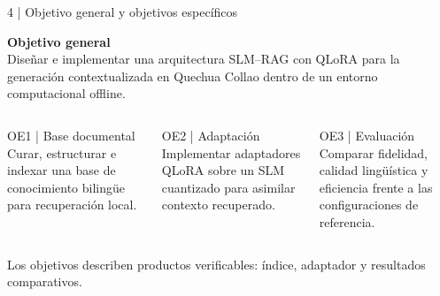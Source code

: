 \documentclass[aspectratio=169,10pt,spanish]{beamer}
\begin{document}
\begin{frame}{4 | Objetivo general y objetivos específicos}
\small
\begin{tcolorbox}[colback=bpNavy,colframe=bpNavy]
\color{white}\textbf{Objetivo general}\\
Diseñar e implementar una arquitectura SLM--RAG con QLoRA para la generación contextualizada en Quechua Collao dentro de un entorno computacional offline.
\end{tcolorbox}
\vspace{0.1cm}
\begin{columns}[T,onlytextwidth]
\begin{block}{OE1 | Base documental}
Curar, estructurar e indexar una base de conocimiento bilingüe para recuperación local.
\end{block}
\begin{block}{OE2 | Adaptación}
Implementar adaptadores QLoRA sobre un SLM cuantizado para asimilar contexto recuperado.
\end{block}
\begin{block}{OE3 | Evaluación}
Comparar fidelidad, calidad lingüística y eficiencia frente a las configuraciones de referencia.
\end{block}
\end{columns}
\vspace{0.12cm}
\centering\scriptsize Los objetivos describen productos verificables: índice, adaptador y resultados comparativos.
\end{frame}
\end{document}
